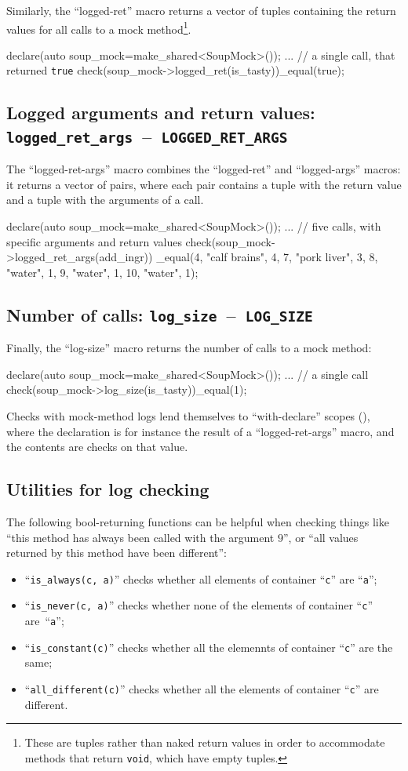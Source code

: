 \documentclass[twoside, a4paper, article]{memoir}
\newcommand*\testudocolor{\color{red!80!blue}}
\newcommand*\testudo[1]{\texttt{\testudocolor{}#1}}
\newcommand*\testudopair[2]{\testudo{#1}~--~\testudo{#2}}
\newcommand\subsectiontestudopair[3]{%
  \subsection[#1]{#1: \testudopair{#2}{#3}}}
\begin{document}
Similarly, the ``logged-ret'' macro returns a vector of tuples containing the
return values for all calls to a mock method\footnote{These are tuples rather
  than naked return values in order to accommodate methods that return
  \texttt{void}, which have empty tuples.}.
\begin{cpplisting}
declare(auto soup_mock=make_shared<SoupMock>());
...
// a single call, that returned \texttt{true}
check(soup_mock->logged_ret(is_tasty))_equal({{true}});
\end{cpplisting}

\subsectiontestudopair{Logged arguments and return values}%
  {logged\_ret\_args}{LOGGED\_RET\_ARGS}

The ``logged-ret-args'' macro combines the ``logged-ret'' and ``logged-args''
macros: it returns a vector of pairs, where each pair contains a tuple with the
return value and a tuple with the arguments of a call.
\begin{cpplisting}
declare(auto soup_mock=make_shared<SoupMock>());
...
// five calls, with specific arguments and return values
check(soup_mock->logged_ret_args(add_ingr))
  _equal({{{4}, {"calf brains", 4}},
          {{7}, {"pork liver", 3}},
          {{8}, {"water", 1}},
          {{9}, {"water", 1}},
          {{10}, {"water", 1}}});
\end{cpplisting}

\subsectiontestudopair{Number of calls}{log\_size}{LOG\_SIZE}

Finally, the ``log-size'' macro returns the number of calls to a mock method:
\begin{cpplisting}
declare(auto soup_mock=make_shared<SoupMock>());
...
// a single call
check(soup_mock->log_size(is_tasty))_equal(1);
\end{cpplisting}

Checks with mock-method logs lend themselves to ``with-declare'' scopes
(), where the declaration is for instance the
result of a ``logged-ret-args'' macro, and the contents are checks on that
value.

\subsection{Utilities for log checking}
\label{sec:utilities-log-checking}

The following bool-returning functions can be helpful when checking things like
``this method has always been called with the argument $9$'', or ``all values
returned by this method have been different'':
\begin{itemize}
\item ``\texttt{is\_always(c, a)}'' checks whether all elements of container
  ``\texttt{c}'' are ``\texttt{a}'';
\item ``\texttt{is\_never(c, a)}'' checks whether none of the elements of
  container ``\texttt{c}'' are~``\texttt{a}'';
\item ``\texttt{is\_constant(c)}'' checks whether all the elemennts of
  container ``\texttt{c}'' are the same;
\item ``\texttt{all\_different(c)}'' checks whether all the elements of
  container ``\texttt{c}'' are different.
\end{itemize}
\end{document}
